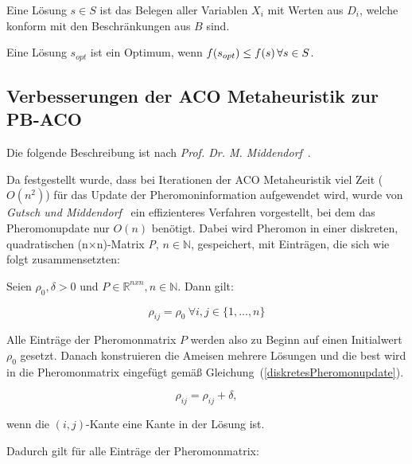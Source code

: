 \documentclass[fontsize=12, a4aper]{scrartcl}
\begin{document}
	Eine Lösung \(s \in S\) ist das Belegen aller Variablen \(X_i\) mit Werten aus \(D_i\), welche konform mit den Beschränkungen aus \(B\) sind.\hfill\newline
	
	Eine Lösung \(s_{opt}\) ist ein Optimum, wenn \(f(s_{opt}) \leq f(s) \hspace{.16667em} \forall s \in S\).
	
	\subsection{Verbesserungen der ACO Metaheuristik zur PB-ACO}
	
	Die folgende Beschreibung ist nach \textit{Prof. Dr. M. Middendorf}~\cite{middendorf2017ant}.\hfill\newline
	
	Da festgestellt wurde, dass bei Iterationen der ACO Metaheuristik viel Zeit (\(O(n^2)\)) für das Update der Pheromoninformation aufgewendet wird, wurde von \textit{Gutsch und Middendorf}~\cite{guntsch2002population} ein effizienteres Verfahren vorgestellt, bei dem das Pheromonupdate nur \(O(n)\) benötigt. Dabei wird Pheromon in einer diskreten, quadratischen (n\(\times\)n)-Matrix \textit{P}, \(n \in \mathbb{N}\), gespeichert, mit Einträgen, die sich wie folgt zusammensetzten:\hfill\newline
	
	\noindent Seien \(\rho_0, \delta > 0\) und \(P \in \mathbb{R}^{nxn}, n \in \mathbb{N}\). Dann gilt:\hfill
	
	\begin{equation}
	\rho_{ij} = \rho_0 ~ \forall i,j \in \{1,...,n\}
	\end{equation}
	
	\noindent Alle Einträge der Pheromonmatrix \(P\) werden also zu Beginn auf einen Initialwert \(\rho_0\) gesetzt. Danach konstruieren die Ameisen mehrere Lösungen und die best wird in die Pheromonmatrix eingefügt gemäß Gleichung~(\ref{diskretesPheromonupdate}).
	
	\begin{equation} \label{diskretesPheromonupdate}
	\rho_{ij} = \rho_{ij} + \delta,
	\end{equation}
	
	\noindent wenn die \((i,j)\)-Kante eine Kante in der Lösung ist.\hfill\newline
	
	\noindent Dadurch gilt für alle Einträge der Pheromonmatrix:
	
\end{document}
